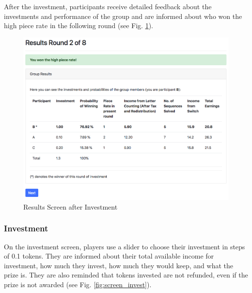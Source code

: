     After the investment, participants receive detailed feedback about the investments and performance of the group and are informed about who won the high piece rate in the following round (see Fig. \ref{fig:screen_results}).
    
    \begin{figure}
        \centering
        \includegraphics[width=\textwidth]{graphs/screen_results.png}
        \caption{Results Screen after Investment}
        \label{fig:screen_results}
    \end{figure}
    
    \subsubsection{Investment}
    
    On the investment screen, players use a slider to choose their investment in steps of 0.1 tokens. They are informed about their total available income for investment, how much they invest, how much they would keep, and what the prize is. They are also reminded that tokens invested are not refunded, even if the prize is not awarded (see Fig. \ref{fig:screen_invest}).
    
